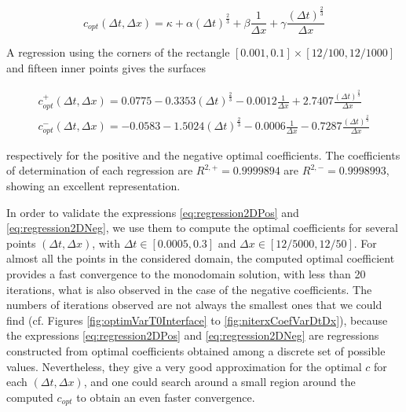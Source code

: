 \begin{equation*}
	c_{opt}(\Delta t, \Delta x) = \kappa + \alpha (\Delta t)^{\frac{2}{3}} + \beta \frac{1}{\Delta x} + \gamma   \frac{(\Delta t)^{\frac{2}{3}}}{\Delta x}
\end{equation*}

\indent A regression using the corners of the rectangle $[0.001,0.1]\times[12/100,12/1000]$ and fifteen inner points gives the surfaces

\begin{gather}
	c_{opt}^+(\Delta t, \Delta x) = 0.0775 -0.3353 (\Delta t)^{\frac{2}{3}} - 0.0012 \frac{1}{\Delta x} + 2.7407   \frac{(\Delta t)^{\frac{2}{3}}}{\Delta x} 	\label{eq:regression2DPos} \\
	c_{opt}^-(\Delta t, \Delta x) = -0.0583 -1.5024 (\Delta t)^{\frac{2}{3}} - 0.0006 \frac{1}{\Delta x} -0.7287  \frac{(\Delta t)^{\frac{2}{3}}}{\Delta x} 	\label{eq:regression2DNeg}
\end{gather}

\noindent respectively for the positive and the negative optimal coefficients. The coefficients of determination of each regression are $R^{2,+} = 0.9999894$ are $R^{2,-} = 0.9998993$, showing an excellent representation.

\indent In order to validate the expressions \eqref{eq:regression2DPos} and \eqref{eq:regression2DNeg}, we use them to compute the optimal coefficients for several points $(\Delta t, \Delta x)$, with $\Delta t \in [0.0005,0.3]$ and $\Delta x \in \left[ 12/5000,12/50\right]$. For almost all the points in the considered domain, the computed optimal coefficient provides a fast convergence to the monodomain solution, with less than 20 iterations, what is also observed in the case of the negative coefficients. The numbers of iterations observed are not always the smallest ones that we could find (cf. Figures \ref{fig:optimVarT0Interface} to \ref{fig:niterxCoefVarDtDx}), because the expressions \eqref{eq:regression2DPos} and \eqref{eq:regression2DNeg} are regressions constructed from optimal coefficients obtained among a discrete set of possible values. Nevertheless, they give a very good approximation for the optimal $c$ for each $(\Delta t, \Delta x)$, and one could search around a small region around the computed $c_{opt}$ to obtain an even faster convergence.

 
